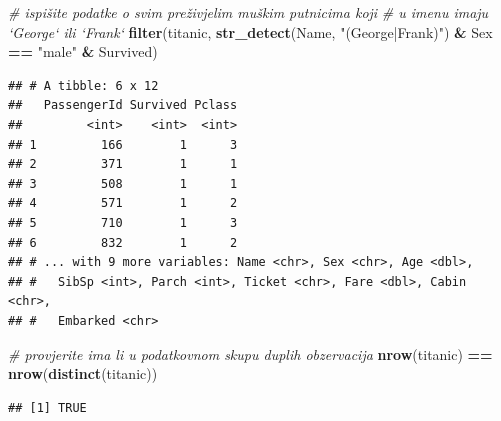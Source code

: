 \documentclass[]{book}
\newenvironment{Shaded}{\begin{snugshade}}{\end{snugshade}}
\newcommand{\KeywordTok}[1]{\textcolor[rgb]{0.13,0.29,0.53}{\textbf{#1}}}
\newcommand{\DecValTok}[1]{\textcolor[rgb]{0.00,0.00,0.81}{#1}}
\newcommand{\StringTok}[1]{\textcolor[rgb]{0.31,0.60,0.02}{#1}}
\newcommand{\CommentTok}[1]{\textcolor[rgb]{0.56,0.35,0.01}{\textit{#1}}}
\newcommand{\OperatorTok}[1]{\textcolor[rgb]{0.81,0.36,0.00}{\textbf{#1}}}
\newcommand{\NormalTok}[1]{#1}
\theoremstyle{definition}
\theoremstyle{definition}
\theoremstyle{definition}
\theoremstyle{remark}
\begin{document}
\begin{Shaded}
\begin{Highlighting}[]
\CommentTok{# ispišite podatke o svim preživjelim muškim putnicima koji }
\CommentTok{# u imenu imaju `George` ili `Frank`}
\KeywordTok{filter}\NormalTok{(titanic, }\KeywordTok{str_detect}\NormalTok{(Name, }\StringTok{"(George|Frank)"}\NormalTok{) }\OperatorTok{&}\StringTok{ }\NormalTok{Sex }\OperatorTok{==}\StringTok{ "male"} \OperatorTok{&}\StringTok{ }\NormalTok{Survived)}
\end{Highlighting}
\end{Shaded}

\begin{verbatim}
## # A tibble: 6 x 12
##   PassengerId Survived Pclass
##         <int>    <int>  <int>
## 1         166        1      3
## 2         371        1      1
## 3         508        1      1
## 4         571        1      2
## 5         710        1      3
## 6         832        1      2
## # ... with 9 more variables: Name <chr>, Sex <chr>, Age <dbl>,
## #   SibSp <int>, Parch <int>, Ticket <chr>, Fare <dbl>, Cabin <chr>,
## #   Embarked <chr>
\end{verbatim}

\begin{Shaded}
\begin{Highlighting}[]
\CommentTok{# provjerite ima li u podatkovnom skupu duplih obzervacija}
\KeywordTok{nrow}\NormalTok{(titanic) }\OperatorTok{==}\StringTok{ }\KeywordTok{nrow}\NormalTok{(}\KeywordTok{distinct}\NormalTok{(titanic))}
\end{Highlighting}
\end{Shaded}

\begin{verbatim}
## [1] TRUE
\end{verbatim}

\begin{Shaded}
\end{Shaded}
\end{document}
